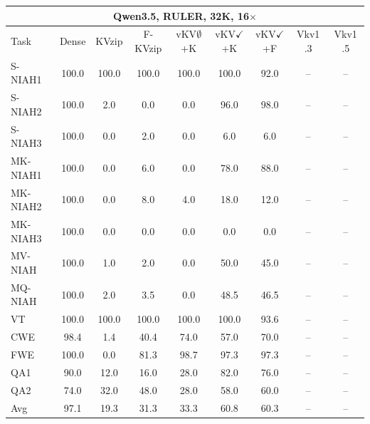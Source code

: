 \begin{tabular}{lcccccccc}
\toprule
\multicolumn{9}{c}{Qwen3.5, RULER, 32K, 16$\times$} \\
\midrule
Task & Dense & KVzip & F-KVzip & vKV$\emptyset$+K & vKV$\checkmark$+K & vKV$\checkmark$+F & Vkv1 .3 & Vkv1 .5 \\
\midrule
S-NIAH1 & 100.0 & 100.0 & 100.0 & 100.0 & 100.0 & 92.0 & -- & -- \\
S-NIAH2 & 100.0 & 2.0 & 0.0 & 0.0 & 96.0 & 98.0 & -- & -- \\
S-NIAH3 & 100.0 & 0.0 & 2.0 & 0.0 & 6.0 & 6.0 & -- & -- \\
MK-NIAH1 & 100.0 & 0.0 & 6.0 & 0.0 & 78.0 & 88.0 & -- & -- \\
MK-NIAH2 & 100.0 & 0.0 & 8.0 & 4.0 & 18.0 & 12.0 & -- & -- \\
MK-NIAH3 & 100.0 & 0.0 & 0.0 & 0.0 & 0.0 & 0.0 & -- & -- \\
MV-NIAH & 100.0 & 1.0 & 2.0 & 0.0 & 50.0 & 45.0 & -- & -- \\
MQ-NIAH & 100.0 & 2.0 & 3.5 & 0.0 & 48.5 & 46.5 & -- & -- \\
VT & 100.0 & 100.0 & 100.0 & 100.0 & 100.0 & 93.6 & -- & -- \\
CWE & 98.4 & 1.4 & 40.4 & 74.0 & 57.0 & 70.0 & -- & -- \\
FWE & 100.0 & 0.0 & 81.3 & 98.7 & 97.3 & 97.3 & -- & -- \\
QA1 & 90.0 & 12.0 & 16.0 & 28.0 & 82.0 & 76.0 & -- & -- \\
QA2 & 74.0 & 32.0 & 48.0 & 28.0 & 58.0 & 60.0 & -- & -- \\
\midrule
Avg & 97.1 & 19.3 & 31.3 & 33.3 & 60.8 & 60.3 & -- & -- \\
\bottomrule
\end{tabular}
\vspace{0.8em}

